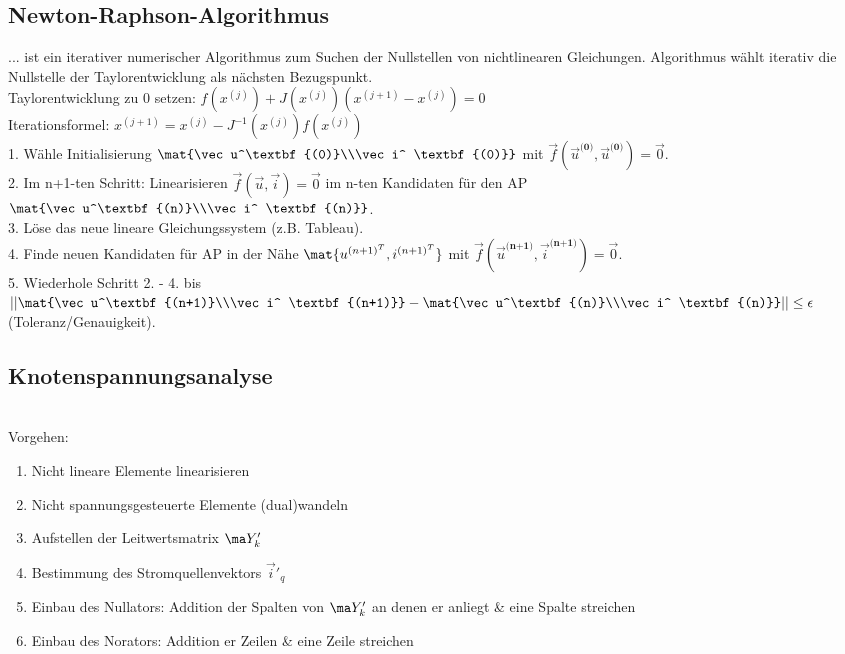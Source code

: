 \documentclass[fs, footer]{latex4ei}
\begin{document}
\begin{multicols*}{4}
    \subsection{Newton-Raphson-Algorithmus}
    ... ist ein iterativer numerischer Algorithmus zum Suchen der Nullstellen von nichtlinearen Gleichungen. Algorithmus wählt iterativ die Nullstelle der Taylorentwicklung als nächsten Bezugspunkt.\\
    Taylorentwicklung zu 0 setzen: $f(x^{(j)}) + J(x^{(j)})(x^{(j+1)}-x^{(j)})=0$\\
    Iterationsformel: $x^{(j+1)} = x^{(j)} - J^{-1}(x^{(j)})f(x^{(j)})$\\
    1. Wähle Initialisierung $\mat{\vec u^\textbf{(0)}\\\vec i^ \textbf{(0)}}$ mit $\vec f(\vec u^\textbf{(0)}, \vec u^\textbf{(0)}) = \vec{0}$.\\
    2. Im n+1-ten Schritt: Linearisieren $\vec f(\vec u, \vec i) = \vec 0$ im n-ten Kandidaten für den AP $\mat{\vec u^\textbf{(n)}\\\vec i^ \textbf{(n)}}$.\\
    3. Löse das neue lineare Gleichungssystem (z.B. Tableau).\\
    4. Finde neuen Kandidaten für AP in der Nähe $\mat{u^{(n+1)^T}, i^{(n+1)^T}}$ mit $\vec f(\vec u^\textbf{(n+1)}, \vec i^ \textbf{(n+1)}) = \vec 0$.\\
    5. Wiederhole Schritt 2. - 4. bis $\left|\left|\mat{\vec u^\textbf{(n+1)}\\\vec i^ \textbf{(n+1)}}-\mat{\vec u^\textbf{(n)}\\\vec i^ \textbf{(n)}}\right|\right| \leq \epsilon$ (Toleranz/Genauigkeit).


    \subsection{Knotenspannungsanalyse}
    \\
    Vorgehen:
    \begin{enumerate}\itemsep0pt
        \item Nicht lineare Elemente linearisieren
        \item Nicht spannungsgesteuerte Elemente (dual)wandeln
        \item Aufstellen der Leitwertsmatrix $\ma Y'_k$
        \item Bestimmung des Stromquellenvektors $\vec i'_q$
        \item Einbau des Nullators: Addition der Spalten von $\ma Y'_k$ an denen er anliegt \& eine Spalte streichen
        \item Einbau des Norators: Addition er Zeilen \& eine Zeile streichen


\end{enumerate}
\end{multicols*}
\end{document}
